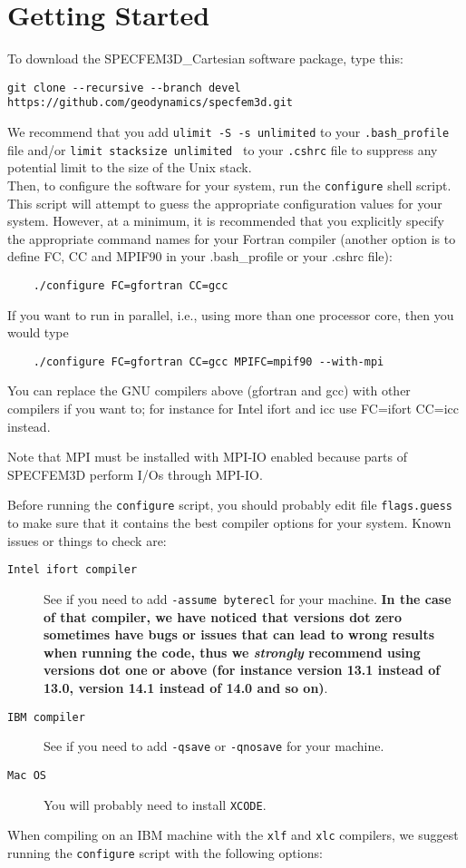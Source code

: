 \chapter{Getting Started}\label{cha:Getting-Started}

To download the SPECFEM3D\_Cartesian software package, type this:
\begin{verbatim}
git clone --recursive --branch devel https://github.com/geodynamics/specfem3d.git
\end{verbatim}
%
\noindent
We recommend that you add {\texttt{ulimit -S -s unlimited}} to your
{\texttt{.bash\_profile}} file and/or {\texttt{limit stacksize
unlimited }} to your {\texttt{.cshrc}} file to suppress any potential
limit to the size of the Unix stack.\\

Then, to configure the software for your system, run the
\texttt{configure} shell script. This script will attempt to guess
the appropriate configuration values for your system. However, at
a minimum, it is recommended that you explicitly specify the appropriate
command names for your Fortran compiler (another option is to define FC, CC and MPIF90 in your .bash\_profile
or your .cshrc file):
%
\begin{verbatim}
    ./configure FC=gfortran CC=gcc
\end{verbatim}
%
If you want to run in parallel, i.e., using more than one processor core, then you would type
%
\begin{verbatim}
    ./configure FC=gfortran CC=gcc MPIFC=mpif90 --with-mpi
\end{verbatim}

You can replace the GNU compilers above (gfortran and gcc) with other compilers if you want to; for instance for Intel ifort and icc use FC=ifort CC=icc instead.

Note that MPI must be installed with MPI-IO enabled because parts of SPECFEM3D perform I/Os through MPI-IO.

Before running the \texttt{configure} script, you should probably
edit file \texttt{flags.guess} to make sure that it contains the best
compiler options for your system. Known issues or things to check
are:
\begin{description}
\item [{\texttt{Intel ifort compiler}}] See if you need to add \texttt{-assume byterecl} for your machine. \textbf{In the case of that compiler, we have noticed that versions dot zero sometimes have bugs or issues that can lead to wrong results when running the code, thus we \emph{strongly} recommend using versions dot one or above (for instance version 13.1 instead of 13.0, version 14.1 instead of 14.0 and so on)}.
\item [{\texttt{IBM compiler}}] See if you need to add \texttt{-qsave}
or \texttt{-qnosave} for your machine.
\item [{\texttt{Mac OS}}] You will probably need to install \texttt{XCODE}.
\end{description}
When compiling on an IBM machine with the \texttt{xlf} and \texttt{xlc}
compilers, we suggest running the \texttt{configure} script with the
following options:

